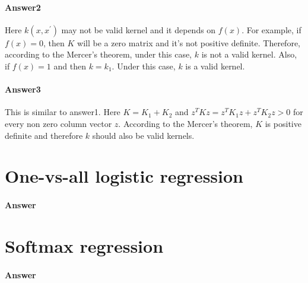 \documentclass[paper=a4, fontsize=11pt]{scrartcl} %
\numberwithin{equation}{section} %
\numberwithin{figure}{section} %
\numberwithin{table}{section} %
\begin{document}
\paragraph{\textbf{Answer2}}
Here $k\left ( x, x^{'} \right )$ may not be valid kernel and it depends on $f\left ( x \right )$. For example, if $f\left ( x \right )=0$, then $K$ will be a zero matrix and it's not positive definite. Therefore, according to the Mercer's theorem, under this case, $k$ is not a valid kernel. Also, if $f\left ( x \right )=1$ and then $k=k_{1}$. Under this case, $k$ is a valid kernel.

\paragraph{\textbf{Answer3}}
This is similar to answer1. Here $K=K_{1}+K_{2}$ and $z^{T}Kz=z^{T}K_{1}z+z^{T}K_{2}z>0$ for every non zero column vector $z$. According to the Mercer's theorem, $K$ is positive definite and therefore $k$ should also be valid kernels.

\section{One-vs-all logistic regression}

\paragraph{\textbf{Answer}}

\section{Softmax regression}

\paragraph{\textbf{Answer}}
\end{document}
